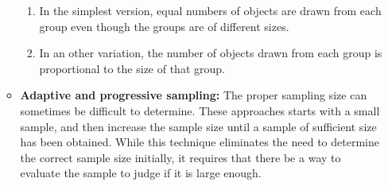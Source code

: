 \begin{itemize}
\begin{itemize}
\begin{enumerate}
							\item In the simplest version, equal numbers of objects are drawn from 
							each group even though the groups are of different sizes. 
							\item In an other variation, the number of objects drawn from each group 
							is proportional to the size of that group. 
						\end{enumerate} 
					\item {\bf Adaptive and progressive sampling:} The proper sampling size
					can sometimes be difficult to determine. These approaches starts with a 
					small sample, and then increase the sample size until a sample of sufficient
					size has been obtained. While this technique eliminates the need to determine
					the correct sample size initially, it requires that there be a way to evaluate
					the sample to judge if it is large enough.
				\end{itemize}			
		\end{itemize}

